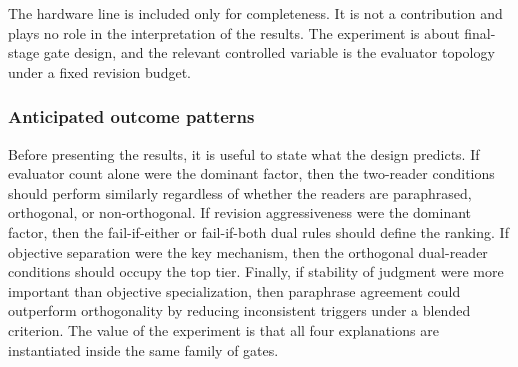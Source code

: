 \documentclass{article}
\begin{document}
\begin{table}[ht]
\centering
\caption{Comparison of Abbrev. across Method, Reader structure, Rewrite scope, Intended test}
\label{tab:2}
\end{table}

The hardware line is included only for completeness. It is not a contribution and plays no role in the interpretation of the results. The experiment is about final-stage gate design, and the relevant controlled variable is the evaluator topology under a fixed revision budget.

\subsubsection{Anticipated outcome patterns}

\label{sec:anticipated_outcome_patterns}

Before presenting the results, it is useful to state what the design predicts. If evaluator count alone were the dominant factor, then the two-reader conditions should perform similarly regardless of whether the readers are paraphrased, orthogonal, or non-orthogonal. If revision aggressiveness were the dominant factor, then the fail-if-either or fail-if-both dual rules should define the ranking. If objective separation were the key mechanism, then the orthogonal dual-reader conditions should occupy the top tier. Finally, if stability of judgment were more important than objective specialization, then paraphrase agreement could outperform orthogonality by reducing inconsistent triggers under a blended criterion. The value of the experiment is that all four explanations are instantiated inside the same family of gates.
\end{document}
